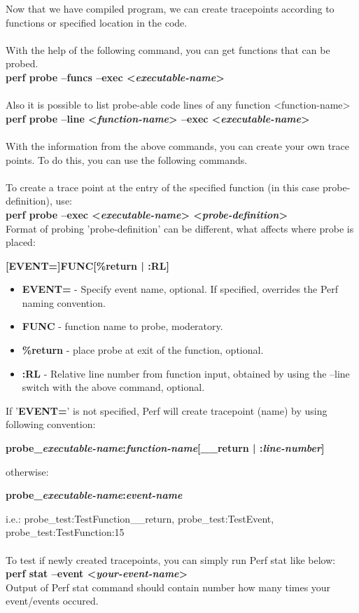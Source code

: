 \documentclass[11pt,onecolumn]{article}
\begin{document}
Now that we have compiled program, we can create tracepoints according to functions or specified location in the code.\\\\
With the help of the following command, you can get functions that can be probed.\\
\quad\textbf{perf probe --funcs --exec <\textit{executable-name}>}\\\\
Also it is possible to list probe-able code lines of any function <function-name>\\
\textbf{perf probe --line <\textit{function-name}> --exec <\textit{executable-name}>}\\\\
With the information from the above commands, you can create your own trace points.
To do this, you can use the following commands.\\\\
To create a trace point at the entry of the specified function (in this case probe-definition), use:\\
\textbf{perf probe –exec <\textit{executable-name}> <\textit{probe-definition}>}\\
Format of probing 'probe-definition' can be different, what affects where probe is placed:
\begin{center}
	\textbf{[EVENT=]FUNC[\%return | :RL]}\newline
\end{center}
\begin{itemize}
	\item \textbf{EVENT=} - Specify event name, optional. If specified, overrides the Perf naming convention.
	\item \textbf{FUNC} - function name to probe, moderatory.
	\item \textbf{\%return} - place probe at exit of the function, optional.
	\item \textbf{:RL} - Relative line number from function input, obtained by using the --line switch with the above command, optional.
\end{itemize}
If '\textbf{EVENT=}' is not specified, Perf will create tracepoint (name) by using following convention:
\begin{center}
	\textbf{probe\_\textit{executable-name}:\textit{function-name}[\_\_return | :\textit{line-number}]}
\end{center}
otherwise:
\begin{center}
	\textbf{probe\_\textit{executable-name}:\textit{event-name}}
\end{center}
i.e.: probe\_test:TestFunction\_\_return, probe\_test:TestEvent, probe\_test:TestFunction:15\\\\
To test if newly created tracepoints, you can simply run Perf stat like below:\\
\textbf{perf stat --event <\textit{your-event-name}>}\\
Output of Perf stat command should contain number how many times your event/events occured.
\end{document}
